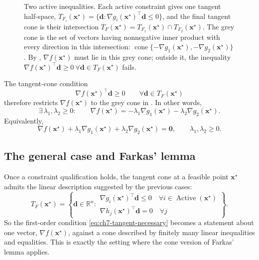 \begin{figure}[ht]
    \centering
    \caption[Two active inequalities and the normal cone]{Two active
    inequalities. Each active constraint gives one tangent half-space,
    $T_{F_i}(\mathbf{x}^\star)=\{\mathbf d:
    \nabla g_i(\mathbf{x}^\star)^\top\mathbf d\le0\}$, and the final tangent
    cone is their intersection
    $T_F(\mathbf{x}^\star)=T_{F_1}(\mathbf{x}^\star)\cap
    T_{F_2}(\mathbf{x}^\star)$. The grey cone is the set of vectors having
    nonnegative inner product with every direction in this intersection:
    $\operatorname{cone}\{-\nabla g_1(\mathbf{x}^\star),
    -\nabla g_2(\mathbf{x}^\star)\}$.
    By , $\nabla f(\mathbf{x}^\star)$ must lie
    in this grey cone; outside it, the inequality
    $\nabla f(\mathbf{x}^\star)^\top\mathbf d\ge0 \ \forall
    \mathbf d\in T_F(\mathbf{x}^\star)$ fails.}
    \label{fig:ch7-kkt-two-inequalities}
\end{figure}

The tangent-cone condition
\[
  \nabla f(\mathbf{x}^\star)^\top\mathbf{d}\ge0
  \qquad \forall \mathbf{d}\in T_F(\mathbf{x}^\star)
\]
therefore restricts $\nabla f(\mathbf{x}^\star)$ to the grey cone in
. In other words,
\[
  \exists\, \lambda_1,\lambda_2\ge0:
  \qquad
  \nabla f(\mathbf{x}^\star)
  =
  -\lambda_1\nabla g_1(\mathbf{x}^\star)
  -\lambda_2\nabla g_2(\mathbf{x}^\star).
\]
Equivalently,
\[
  \nabla f(\mathbf{x}^\star)
  +\lambda_1\nabla g_1(\mathbf{x}^\star)
  +\lambda_2\nabla g_2(\mathbf{x}^\star)
  =
  \mathbf{0},
  \qquad
  \lambda_1,\lambda_2\ge0.
\]

\subsection{The general case and Farkas' lemma}
\label{sec:ch7-farkas}
Once a constraint qualification holds, the tangent cone at a feasible point
$\mathbf{x}^\star$ admits the linear description suggested by the previous cases:
\begin{equation}
  \label{eq:ch7-general-tangent-cone}
  T_F(\mathbf{x}^\star)
  =
  \left\{
    \mathbf{d}\in\mathbb{R}^n:
    \begin{array}{l}
      \nabla g_i(\mathbf{x}^\star)^\top \mathbf{d}\le 0
      \quad \forall i\in \operatorname{Active}(\mathbf{x}^\star)\\
      \nabla h_j(\mathbf{x}^\star)^\top \mathbf{d}=0
      \quad \forall j
    \end{array}
  \right\}.
\end{equation}
So the first-order condition
\eqref{eq:ch7-tangent-necessary} becomes a statement about one vector,
$\nabla f(\mathbf{x}^\star)$, against a cone described by finitely many linear
inequalities and equalities. This is exactly the setting where the cone version
of Farkas' lemma applies.


